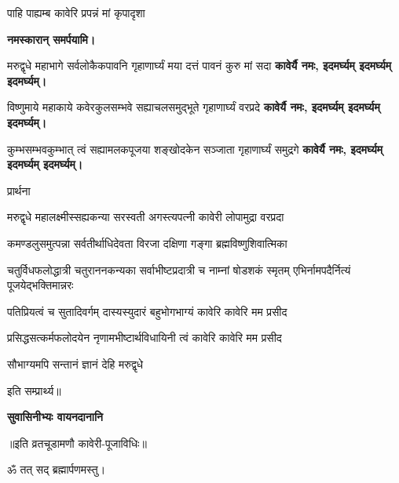 \begin{center}
\begin{center}
{पाहि पाह्यम्ब कावेरि प्रपन्नं मां कृपादृशा}

\textbf{\devAya{} नमस्कारान् समर्पयामि।}



    \twolineshloka
    {मरुद्वृधे महाभागे सर्वलोकैकपावनि}
    {गृहाणार्घ्यं मया दत्तं पावनं कुरु मां सदा}
    \textbf{कावेर्यै नमः, इदमर्घ्यम् इदमर्घ्यम् इदमर्घ्यम्।}

    \twolineshloka
    {विष्णुमाये महाकाये कवेरकुलसम्भवे}
    {सह्याचलसमुद्भूते गृहाणार्घ्यं वरप्रदे}
    \textbf{कावेर्यै नमः, इदमर्घ्यम् इदमर्घ्यम् इदमर्घ्यम्।}

    \twolineshloka
    {कुम्भसम्भवकुम्भात् त्वं सह्यामलकपूजया}
    {शङ्खोदकेन सञ्जाता गृहाणार्घ्यं समुद्रगे}
    \textbf{कावेर्यै नमः, इदमर्घ्यम् इदमर्घ्यम् इदमर्घ्यम्।}


\centerline{प्रार्थना}
\resetShloka

\twolineshloka
{मरुद्वृधे महालक्ष्मीस्सह्यकन्या सरस्वती}
{अगस्त्यपत्नी कावेरी लोपामुद्रा वरप्रदा}

\twolineshloka
{कमण्डलुसमुत्पन्ना सर्वतीर्थाधिदेवता}
{विरजा दक्षिणा गङ्गा ब्रह्मविष्णुशिवात्मिका}

\threelineshloka
{चतुर्विधफलोद्धात्री चतुराननकन्यका}
{सर्वाभीष्टप्रदात्री च नाम्नां षोडशकं स्मृतम्}
{एभिर्नामपदैर्नित्यं पूजयेद्भक्तिमान्नरः}

{पतिप्रियत्वं च सुतादिवर्गम्}
{दास्यस्युदारं बहुभोगभाग्यं}
{कावेरि कावेरि मम प्रसीद}

{प्रसिद्धसत्कर्मफलोदयेन}
{नृणामभीष्टार्थविधायिनी त्वं}
{कावेरि कावेरि मम प्रसीद}

{सौभाग्यमपि सन्तानं ज्ञानं देहि मरुद्वृधे}

इति सम्प्रार्थ्य॥

\centerline{\textbf{सुवासिनीभ्यः वायनदानानि}}

\end{center}

\centerline {॥इति व्रतचूडामणौ कावेरी-पूजाविधिः॥}

\medskip

\centerline{ॐ तत् सद् ब्रह्मार्पणमस्तु।}

\closesection

\end{center}